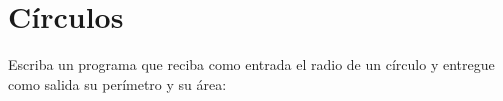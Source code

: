 \section{Círculos}

Escriba un programa que reciba como entrada el radio de un círculo y
entregue como salida su perímetro y su área:
